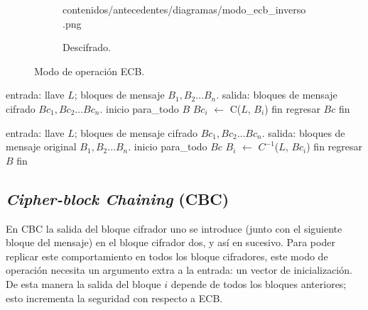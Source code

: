\begin{figure}[H]
\begin{subfigure}{0.45\textwidth}
\begin{center}
            {contenidos/antecedentes/diagramas/modo_ecb_inverso.png}
          \caption{Descifrado.}
      \end{center}
  \end{subfigure}
  \caption{Modo de operación ECB.}
  \label{figura:ecb}
\end{figure}

\begin{pseudocodigo}[caption={Modo de operación ECB, cifrado.}]
  entrada: llave $ L $; bloques de mensaje $ B_1, B_2 \dots B_n $.
   salida: bloques de mensaje cifrado $ Bc_1, Bc_2 \dots Bc_n $.
  inicio
    para_todo $B$
      $Bc_i$ $\gets$ C($L$, $B_i$)
    fin
    regresar $Bc$
  fin
\end{pseudocodigo}

\begin{pseudocodigo}[caption={Modo de operación ECB, descifrado.}]
  entrada: llave $ L $; bloques de mensaje cifrado $ Bc_1, Bc_2 \dots Bc_n $.
   salida: bloques de mensaje original $ B_1, B_2 \dots B_n $.
  inicio
    para_todo $Bc$
      $B_i$ $\gets$ $C^{-1}$($L$, $Bc_i$)
    fin
    regresar $B$
  fin
\end{pseudocodigo}


\subsection{\textit{Cipher-block Chaining} (CBC)}

En CBC la salida del bloque cifrador uno se introduce (junto con el siguiente
bloque del mensaje) en el bloque cifrador dos, y así en sucesivo. Para poder
replicar este comportamiento en todos los bloque cifradores, este modo de
operación necesita un argumento extra a la entrada: un vector de
inicialización. De esta manera la salida del bloque $ i $ depende de todos
los bloques anteriores; esto incrementa la seguridad con respecto a ECB.

\vspace{0.5cm}


